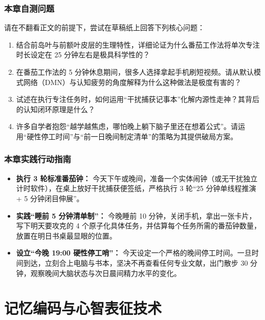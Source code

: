 \documentclass[12pt,a4paper,openany]{ctexbook}
\begin{document}
\section*{本章自测问题}
请在不翻看正文的前提下，尝试在草稿纸上回答下列核心问题：
\begin{enumerate}
    \item 结合前岛叶与前额叶皮层的生理特性，详细论证为什么番茄工作法将单次专注时长设定在 25 分钟左右是极具科学性的？
    \item 在番茄工作法的 5 分钟休息期间，很多人选择拿起手机刷短视频。请从默认模式网络（DMN）与认知疲劳的角度解释为什么这种做法是极度有害的？
    \item 试述在执行专注任务时，如何运用“干扰捕获记事本”化解内源性走神？其背后的认知闭环原理是什么？
    \item 许多自学者抱怨“越学越焦虑，哪怕晚上躺下脑子里还在想着公式”。请运用“硬性停工时间”与“前一日晚间制定清单”的策略为其提供破局方案。
\end{enumerate}

\section*{本章实践行动指南}
\begin{practicebox}[本周抗拖延工程落地清单]
\begin{itemize}
    \item[$\square$] \textbf{执行 3 轮标准番茄钟：} 今天下午或晚间，准备一个实体闹钟（或无干扰独立计时软件），在桌上放好干扰捕获便签纸，严格执行 3 轮“25 分钟单线程推演 + 5 分钟闭目伸展”。
    \item[$\square$] \textbf{实践“睡前 5 分钟清单制”：} 今晚睡前 10 分钟，关闭手机，拿出一张卡片，写下明天要攻克的 4 个原子化具体任务，并估算每个任务所需的番茄钟数量，放置在明日书桌最显眼的位置。
    \item[$\square$] \textbf{设立“今晚 19:00 硬性停工哨”：} 今天设定一个严格的晚间停工时间。一旦时间到达，立刻合上电脑与书本，坚决不再查看任何专业文献，出门散步 30 分钟，观察晚间大脑状态与次日晨间精力水平的变化。
\end{itemize}
\end{practicebox}

\part{记忆编码与心智表征技术}
\end{document}
